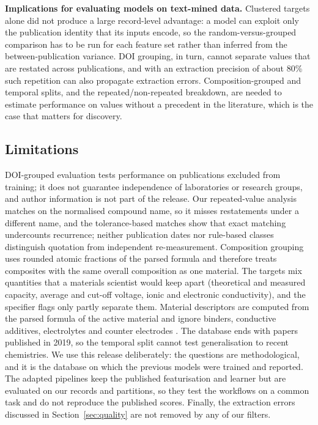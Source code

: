 \documentclass[journal=jcisd8,manuscript=article,layout=traditional]{achemso}
\begin{document}
\textbf{Implications for evaluating models on text-mined data.} Clustered targets alone did not produce a large record-level advantage: a model can exploit only the publication identity that its inputs encode, so the random-versus-grouped comparison has to be run for each feature set rather than inferred from the between-publication variance. DOI grouping, in turn, cannot separate values that are restated across publications, and with an extraction precision of about 80\% such repetition can also propagate extraction errors. Composition-grouped and temporal splits, and the repeated/non-repeated breakdown, are needed to estimate performance on values without a precedent in the literature, which is the case that matters for discovery.

\subsection{Limitations}
\label{sec:limitations}

DOI-grouped evaluation tests performance on publications excluded from training; it does not guarantee independence of laboratories or research groups, and author information is not part of the release. Our repeated-value analysis matches on the normalised compound name, so it misses restatements under a different name, and the tolerance-based matches show that exact matching undercounts recurrence; neither publication dates nor rule-based classes distinguish quotation from independent re-measurement. Composition grouping uses rounded atomic fractions of the parsed formula and therefore treats composites with the same overall composition as one material. The targets mix quantities that a materials scientist would keep apart (theoretical and measured capacity, average and cut-off voltage, ionic and electronic conductivity), and the specifier flags only partly separate them. Material descriptors are computed from the parsed formula of the active material and ignore binders, conductive additives, electrolytes and counter electrodes \cite{kauwe2019battery}. The database ends with papers published in 2019, so the temporal split cannot test generalisation to recent chemistries. We use this release deliberately: the questions are methodological, and it is the database on which the previous models were trained and reported. The adapted pipelines keep the published featurisation and learner but are evaluated on our records and partitions, so they test the workflows on a common task and do not reproduce the published scores. Finally, the extraction errors discussed in Section~\ref{sec:quality} are not removed by any of our filters.
\end{document}

